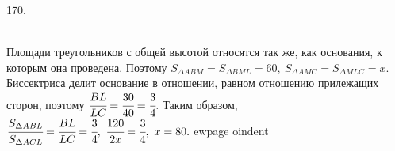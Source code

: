 170. \begin{figure}[ht!]
\end{figure}\\
Площади треугольников с общей высотой относятся так же, как основания, к которым она проведена. Поэтому $S_{\Delta ABM}=S_{\Delta BML}=60,\ S_{\Delta AMC}=S_{\Delta MLC}=x.$ Биссектриса делит основание в отношении, равном отношению прилежащих сторон, поэтому $\cfrac{BL}{LC}=\cfrac{30}{40}=\cfrac{3}{4}.$ Таким образом,
$\cfrac{S_{\Delta ABL}}{S_{\Delta ACL}}=\cfrac{BL}{LC}=\cfrac{3}{4},\ \cfrac{120}{2x}=\cfrac{3}{4},\ x=80.$
ewpage
oindent
